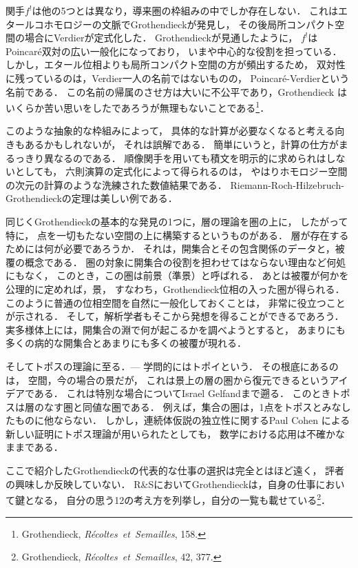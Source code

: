 \documentclass[9pt, a4paper, dvipdfmx]{jlreq}
\theoremstyle{definition}
\theoremstyle{mystyle}
\numberwithin{equation}{section} %
\begin{document}
関手$f^!$は他の5つとは異なり，導来圏の枠組みの中でしか存在しない．
これはエタールコホモロジーの文脈でGrothendieckが発見し，
その後局所コンパクト空間の場合にVerdierが定式化した．
Grothendieckが見通したように，
$f^!$はPoincar\'e双対の広い一般化になっており，
いまや中心的な役割を担っている．
しかし，エタール位相よりも局所コンパクト空間の方が頻出するため，
双対性に残っているのは，Verdier一人の名前ではないものの，
Poincar\'e-Verdierという名前である．
この名前の帰属のさせ方は大いに不公平であり，Grothendieck
はいくらか苦い思いをしたであろうが無理もないことである\footnote[11]{
    Grothendieck,
    \textit{R\'ecoltes\ et\ Semailles}, 158.
}．

このような抽象的な枠組みによって，
具体的な計算が必要なくなると考える向きもあるかもしれないが，
それは誤解である．
簡単にいうと，計算の仕方がまるっきり異なるのである．
順像関手を用いても積文を明示的に求められはしないとしても，
六則演算の定式化によって得られるのは，
やはりホモロジー空間の次元の計算のような洗練された数値結果である．
Riemann-Roch-Hilzebruch-Grothendieckの定理は美しい例である．

同じくGrothendieckの基本的な発見の1つに，層の理論を圏の上に，
したがって特に，
点を一切もたない空間の上に構築するというものがある．
層が存在するためには何が必要であろうか．
それは，開集合とその包含関係のデータと，被覆の概念である．
圏の対象に開集合の役割を担わせてはならない理由など何処にもなく，
このとき，この圏は前景（準景）と呼ばれる．
あとは被覆が何かを公理的に定めれば，景，
すなわち，Grothendieck位相の入った圏が得られる．
このように普通の位相空間を自然に一般化しておくことは，
非常に役立つことが示される．
そして，解析学者もそこから発想を得ることができるであろう．
実多様体上には，開集合の淵で何が起こるかを調べようとすると，
あまりにも多くの病的な開集合とあまりにも多くの被覆が現れる．

そしてトポスの理論に至る．--- 学問的にはトポイという．
その根底にあるのは，
空間，今の場合の景だが，
これは景上の層の圏から復元できるというアイデアである．
これは特別な場合についてIsrael Gelfandまで遡る．
このときトポスは層のなす圏と同値な圏である．
例えば，集合の圏は，1点をトポスとみなしたものに他ならない．
しかし，連続体仮説の独立性に関するPaul Cohen による
新しい証明にトポス理論が用いられたとしても，
数学における応用は不確かなままである．

ここで紹介したGrothendieckの代表的な仕事の選択は完全とはほど遠く，
評者の興味しか反映していない．
R\&SにおいてGrothendieckは，自身の仕事において鍵となる，
自分の思う12の考え方を列挙し，自分の一覧も載せている\footnote[12]{
    Grothendieck,
    \textit{R\'ecoltes\ et\ Semailles}, 42, 377.
}．
\end{document}
